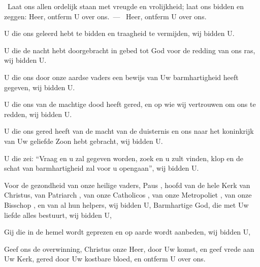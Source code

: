 \documentclass[12pt,twoside,a5paper]{article}
\begin{document}


\begin{halfparskip}
  \dd~Laat ons allen ordelijk staan met vreugde en vrolijkheid; laat ons bidden en zeggen: Heer, ontferm U over ons.~--- \rr~Heer, ontferm U over ons. 

  U die ons geleerd hebt te bidden en traagheid te vermijden, wij bidden U.

  U die de nacht hebt doorgebracht in gebed tot God voor de redding van ons ras, wij bidden U.

  U die ons door onze aardse vaders een bewijs van Uw barmhartigheid heeft gegeven, wij bidden U.

  U die ons van de machtige dood heeft gered, en op wie wij vertrouwen om ons te redden, wij bidden U.

  U die ons gered heeft van de macht van de duisternis en ons naar het koninkrijk van Uw geliefde Zoon hebt gebracht, wij bidden U.

  U die zei: ``Vraag en u zal gegeven worden, zoek en u zult vinden, klop en de schat van barmhartigheid zal voor u opengaan'', wij bidden U.

  Voor de gezondheid van onze heilige vaders, Paus \NN , hoofd van de hele Kerk van Christus, van Patriarch \NN , van onze Catholicos \NN , van onze Metropoliet \NN , van onze Bisschop \NN , en van al hun helpers, wij bidden U, Barmhartige God, die met Uw liefde alles bestuurt, wij bidden U,

  Gij die in de hemel wordt geprezen en op aarde wordt aanbeden, wij bidden U,

  Geef ons de overwinning, Christus onze Heer, door Uw komst, en geef vrede aan Uw Kerk, gered door Uw kostbare bloed, en ontferm U over ons.
\end{halfparskip}


\end{document}
